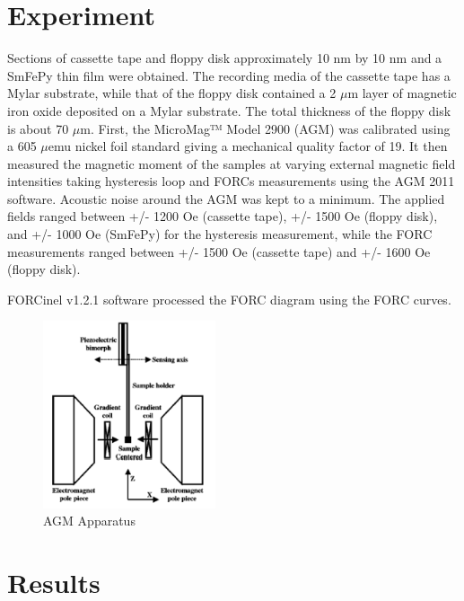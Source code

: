 \documentclass[aps,twocolumn,groupedaddress]{revtex4}
\begin{document}
\section{Experiment}
Sections of cassette tape and floppy disk approximately 10 nm by 10 nm and a SmFePy thin film were obtained. The recording media of the cassette tape has a Mylar substrate, while that of the floppy disk contained a 2 $\mu$m layer of magnetic iron oxide deposited on a Mylar substrate. The total thickness of the floppy disk is about 70 $\mu$m. First, the MicroMag™ Model 2900 (AGM) was calibrated using a 605 $\mu$emu nickel foil standard giving a mechanical quality factor of 19. It then measured the magnetic moment of the samples at varying external magnetic field intensities taking hysteresis loop and FORCs measurements using the AGM 2011 software. Acoustic noise around the AGM was kept to a minimum. The applied fields ranged between +/- 1200 Oe (cassette tape), +/- 1500 Oe (floppy disk), and +/- 1000 Oe (SmFePy) for the hysteresis measurement, while the FORC measurements ranged between +/- 1500 Oe (cassette tape) and +/- 1600 Oe (floppy disk).

FORCinel v1.2.1 software processed the FORC diagram using the FORC curves.\\

\begin{figure}[h]
\includegraphics[width=2.0in]{aparatus}
\caption{AGM Apparatus}
\end{figure}

\section{Results}
\end{document}
